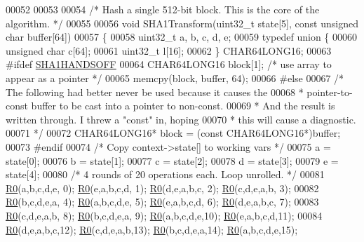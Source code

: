 \begin{DoxyCode}
{00052 
00053 
00054 \textcolor{comment}{/* Hash a single 512-bit block. This is the core of the algorithm. */}
00055 
00056 \textcolor{keywordtype}{void} SHA1Transform(uint32\_t state[5], \textcolor{keyword}{const} \textcolor{keywordtype}{unsigned} \textcolor{keywordtype}{char} buffer[64])
00057 \{
00058     uint32\_t a, b, c, d, e;
00059     \textcolor{keyword}{typedef} \textcolor{keyword}{union} \{
00060         \textcolor{keywordtype}{unsigned} \textcolor{keywordtype}{char} c[64];
00061         uint32\_t l[16];
00062     \} CHAR64LONG16;
00063 \textcolor{preprocessor}{#}\textcolor{preprocessor}{ifdef} \hyperlink{sha1_8c_a9e2c8862606a4549edef298248089783}{SHA1HANDSOFF}
00064     CHAR64LONG16 block[1];  \textcolor{comment}{/* use array to appear as a pointer */}
00065     memcpy(block, buffer, 64);
00066 \textcolor{preprocessor}{#}\textcolor{preprocessor}{else}
00067     \textcolor{comment}{/* The following had better never be used because it causes the}
00068 \textcolor{comment}{     * pointer-to-const buffer to be cast into a pointer to non-const.}
00069 \textcolor{comment}{     * And the result is written through.  I threw a "const" in, hoping}
00070 \textcolor{comment}{     * this will cause a diagnostic.}
00071 \textcolor{comment}{     */}
00072     CHAR64LONG16* block = (\textcolor{keyword}{const} CHAR64LONG16*)buffer;
00073 \textcolor{preprocessor}{#}\textcolor{preprocessor}{endif}
00074     \textcolor{comment}{/* Copy context->state[] to working vars */}
00075     a = state[0];
00076     b = state[1];
00077     c = state[2];
00078     d = state[3];
00079     e = state[4];
00080     \textcolor{comment}{/* 4 rounds of 20 operations each. Loop unrolled. */}
00081     \hyperlink{sha1_8c_a8ac24a09e1273548828d3cc9436f9bc7}{R0}(a,b,c,d,e, 0); \hyperlink{sha1_8c_a8ac24a09e1273548828d3cc9436f9bc7}{R0}(e,a,b,c,d, 1); \hyperlink{sha1_8c_a8ac24a09e1273548828d3cc9436f9bc7}{R0}(d,e,a,b,c, 2); \hyperlink{sha1_8c_a8ac24a09e1273548828d3cc9436f9bc7}{R0}(c,d,e,a,b, 3);
00082     \hyperlink{sha1_8c_a8ac24a09e1273548828d3cc9436f9bc7}{R0}(b,c,d,e,a, 4); \hyperlink{sha1_8c_a8ac24a09e1273548828d3cc9436f9bc7}{R0}(a,b,c,d,e, 5); \hyperlink{sha1_8c_a8ac24a09e1273548828d3cc9436f9bc7}{R0}(e,a,b,c,d, 6); \hyperlink{sha1_8c_a8ac24a09e1273548828d3cc9436f9bc7}{R0}(d,e,a,b,c, 7);
00083     \hyperlink{sha1_8c_a8ac24a09e1273548828d3cc9436f9bc7}{R0}(c,d,e,a,b, 8); \hyperlink{sha1_8c_a8ac24a09e1273548828d3cc9436f9bc7}{R0}(b,c,d,e,a, 9); \hyperlink{sha1_8c_a8ac24a09e1273548828d3cc9436f9bc7}{R0}(a,b,c,d,e,10); \hyperlink{sha1_8c_a8ac24a09e1273548828d3cc9436f9bc7}{R0}(e,a,b,c,d,11);
00084     \hyperlink{sha1_8c_a8ac24a09e1273548828d3cc9436f9bc7}{R0}(d,e,a,b,c,12); \hyperlink{sha1_8c_a8ac24a09e1273548828d3cc9436f9bc7}{R0}(c,d,e,a,b,13); \hyperlink{sha1_8c_a8ac24a09e1273548828d3cc9436f9bc7}{R0}(b,c,d,e,a,14); \hyperlink{sha1_8c_a8ac24a09e1273548828d3cc9436f9bc7}{R0}(a,b,c,d,e,15);
}
\end{DoxyCode}
